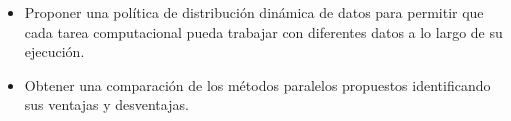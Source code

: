 \begin{itemize}
\item {Proponer una política de distribución dinámica de datos para permitir que cada tarea computacional pueda trabajar con diferentes datos a lo largo de su ejecución.} 

\item {Obtener una comparación de los métodos paralelos propuestos identificando sus ventajas y desventajas}. 
\end{itemize}






